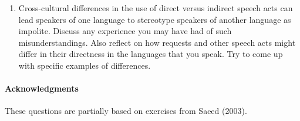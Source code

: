 \documentclass[a4paper]{article}
\begin{document}
\begin{enumerate}
\item Cross-cultural differences in the use of direct versus indirect
  speech acts can lead speakers of one language to stereotype speakers
  of another language as impolite. Discuss any experience you may have
  had of such misunderstandings. Also reflect on how requests and
  other speech acts might differ in their directness in the languages
  that you speak. Try to come up with specific examples of
  differences.

\end{enumerate}
\vfill
\paragraph{Acknowledgments} These questions are partially
based on exercises from Saeed (2003).
\end{document}
